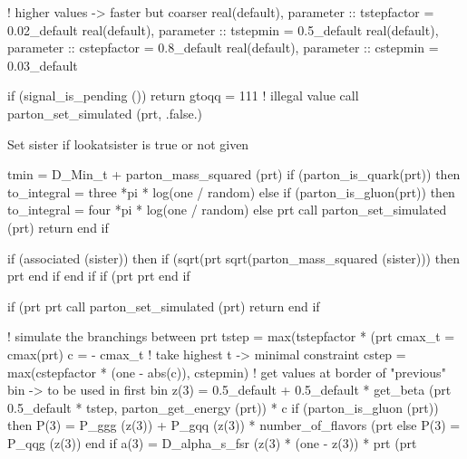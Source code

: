     ! higher values -> faster but coarser
    real(default), parameter :: tstepfactor = 0.02_default
    real(default), parameter :: tstepmin = 0.5_default
    real(default), parameter :: cstepfactor = 0.8_default
    real(default), parameter :: cstepmin = 0.03_default

    if (signal_is_pending ()) return
    gtoqq = 111 ! illegal value
    call parton_set_simulated (prt, .false.)

    \LA{}Set \code{}sister\edoc{} if \code{}lookatsister\edoc{} is true or not given\RA{}

    tmin = D_Min_t + parton_mass_squared (prt)
    if (parton_is_quark(prt)) then
       to_integral = three *pi * log(one / random)
    else if (parton_is_gluon(prt)) then
       to_integral = four *pi * log(one / random)
    else
       prt%
       call parton_set_simulated (prt)
       return
    end if

    if (associated (sister)) then
       if (sqrt(prt%
            sqrt(parton_mass_squared (sister))) then
          prt%
       end if
    end if
    if (prt%
        prt%
    end if

    if (prt%
       prt%
       call parton_set_simulated (prt)
       return
    end if

    ! simulate the branchings between prt%
    tstep = max(tstepfactor * (prt%
    cmax_t = cmax(prt)
    c = - cmax_t ! take highest t -> minimal constraint
    cstep = max(cstepfactor * (one - abs(c)), cstepmin)
    ! get values at border of "previous" bin -> to be used in first bin
    z(3) = 0.5_default + 0.5_default * get_beta (prt%
         0.5_default * tstep, parton_get_energy (prt)) * c
    if (parton_is_gluon (prt)) then
       P(3) = P_ggg (z(3)) + P_gqq (z(3)) * number_of_flavors (prt%
    else
       P(3) = P_qqg (z(3))
    end if
    a(3) = D_alpha_s_fsr (z(3) * (one - z(3)) * prt%
         (prt%


